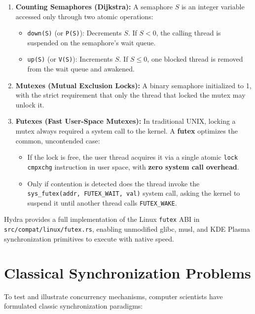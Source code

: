 \begin{enumerate}
    \item \textbf{Counting Semaphores (Dijkstra):} A semaphore $S$ is an integer variable accessed only through two atomic operations:
    \begin{itemize}
        \item \texttt{down(S)} (or \texttt{P(S)}): Decrements $S$. If $S < 0$, the calling thread is suspended on the semaphore's wait queue.
        \item \texttt{up(S)} (or \texttt{V(S)}): Increments $S$. If $S \le 0$, one blocked thread is removed from the wait queue and awakened.
    \end{itemize}
    \item \textbf{Mutexes (Mutual Exclusion Locks):} A binary semaphore initialized to 1, with the strict requirement that only the thread that locked the mutex may unlock it.
    \item \textbf{Futexes (Fast User-Space Mutexes):} In traditional UNIX, locking a mutex always required a system call to the kernel. A \textbf{futex} optimizes the common, uncontended case:
    \begin{itemize}
        \item If the lock is free, the user thread acquires it via a single atomic \texttt{lock cmpxchg} instruction in user space, with \textbf{zero system call overhead}.
        \item Only if contention is detected does the thread invoke the \texttt{sys\_futex(addr, FUTEX\_WAIT, val)} system call, asking the kernel to suspend it until another thread calls \texttt{FUTEX\_WAKE}.
    \end{itemize}
\end{enumerate}

Hydra provides a full implementation of the Linux \texttt{futex} ABI in \texttt{src/compat/linux/futex.rs}, enabling unmodified glibc, musl, and KDE Plasma synchronization primitives to execute with native speed.

\section{Classical Synchronization Problems}
\label{sec:classical_problems}

To test and illustrate concurrency mechanisms, computer scientists have formulated classic synchronization paradigms:

